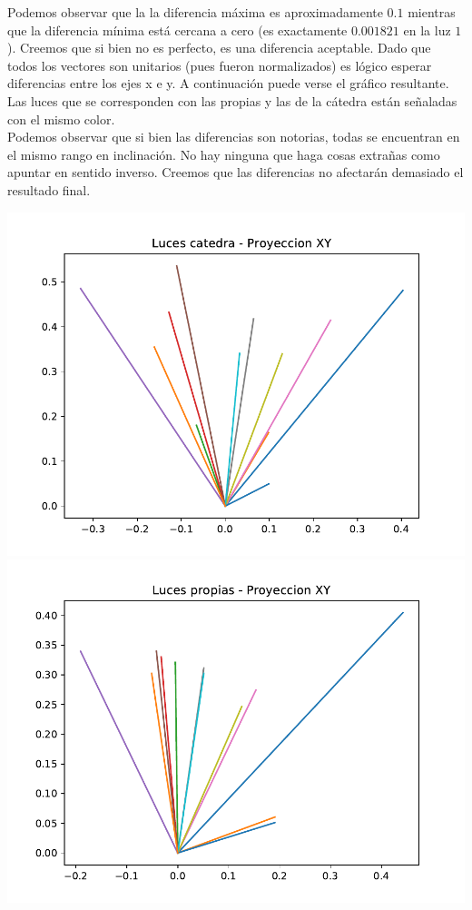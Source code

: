 Podemos observar que la la diferencia máxima es aproximadamente $0.1$ mientras que la diferencia mínima está cercana a cero (es exactamente $0.001821$ en la luz $1$). Creemos que si bien no es perfecto, es una diferencia aceptable. Dado que todos los vectores son unitarios (pues fueron normalizados) es lógico esperar diferencias entre los ejes x e y. A continuación puede verse el gráfico resultante. Las luces que se corresponden con las propias y las de la cátedra están señaladas con el mismo color. \\

Podemos observar que si bien las diferencias son notorias, todas se encuentran en el mismo rango en inclinación. No hay ninguna que haga cosas extrañas como apuntar en sentido inverso. Creemos que las diferencias no afectarán demasiado el resultado final.

{\centering
    \includegraphics[scale=0.8]{informe/imagenes/lucesCatedraProyeccionXY.pdf} \\
}
{\centering
    \includegraphics[scale=0.8]{informe/imagenes/lucesPropiasProyeccionXY.pdf} \\
}

$ $\newline
